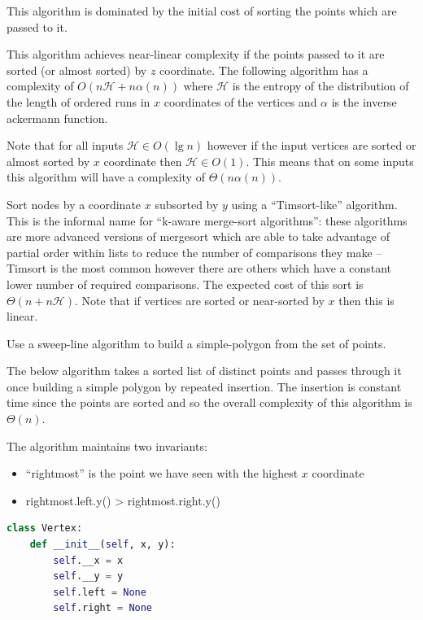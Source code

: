 \documentclass[10pt,\jkfside,a4paper]{article}
\begin{document}
\begin{enumerate}
\begin{enumerate}
\begin{itemize}
\end{itemize}

This algorithm is dominated by the initial cost of sorting the points which are passed to it.

This algorithm achieves near-linear complexity if the points passed to it 
are sorted (or almost sorted) by $z$ coordinate. The following algorithm has a 
complexity of $O(n\mathcal{H} + n\alpha(n))$ where $\mathcal{H}$ is the 
entropy of the distribution of the length of ordered runs in $x$ coordinates of the 
vertices and $\alpha$ is the inverse ackermann function.

Note that for all inputs $\mathcal{H} \in O(\lg n)$ however if the input vertices are 
sorted or almost sorted by $x$ coordinate then $\mathcal{H} \in O(1)$. This means that on some 
inputs this algorithm will have a complexity of $\Theta(n\alpha(n))$. 

Sort nodes by a coordinate $x$ subsorted by $y$ using a ``Timsort-like'' algorithm. This is the 
informal name for ``k-aware merge-sort algorithms'': these algorithms are 
more advanced versions of mergesort which are able to take advantage of partial order within 
lists to reduce the number of comparisons they make -- Timsort is the most common however there are others 
which have a constant lower number of required comparisons. The expected cost of this sort is
$\Theta(n + n\mathcal{H})$. Note that if vertices are sorted or near-sorted by $x$ then this is linear.

Use a sweep-line algorithm to build a simple-polygon from the set of points.

The below algorithm takes a sorted list of distinct points and passes through it once building a 
simple polygon by repeated insertion. The insertion is constant time since the points are sorted and 
so the overall complexity of this algorithm is $\Theta(n)$.

The algorithm maintains two invariants: 
\begin{itemize}

\item ``rightmost'' is the point we have seen with the highest $x$ coordinate

\item rightmost.left.y() > rightmost.right.y()

\end{itemize}

\begin{lstlisting}[language=python]
class Vertex:
    def __init__(self, x, y):
        self.__x = x
        self.__y = y
        self.left = None
        self.right = None


\end{lstlisting}
\end{enumerate}
\end{enumerate}
\end{document}
